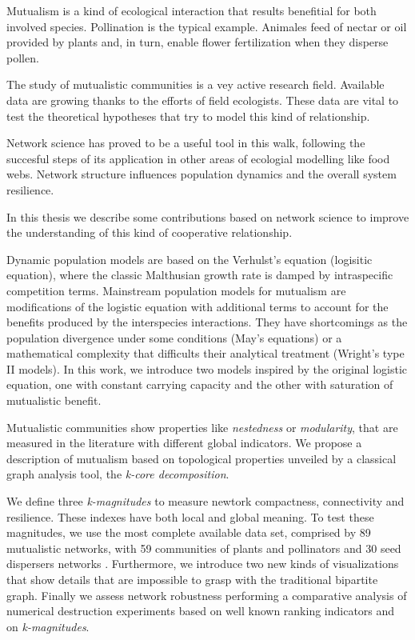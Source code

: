 \documentclass[
11pt, %
spanish, %
onehalfspacing, %
]{MastersDoctoralThesis_custom} %
\newcounter{theo}%
\begin{document}
\renewcommand{\authorshipname}{Abstract}
\begin{declaration}
\addchaptertocentry{\authorshipname}

Mutualism is a kind of ecological interaction that results benefitial for both involved species. Pollination is the typical example. Animales feed of nectar or oil provided by plants and, in turn, enable flower fertilization when they disperse pollen.   

The study of mutualistic communities is a vey active research field. Available data are growing thanks to the efforts of field ecologists. These data are vital to test the theoretical hypotheses that try to model this kind of relationship.

Network science has proved to be a useful tool in this walk, following the succesful steps of its application in other areas of ecologial modelling like food webs. Network structure influences population dynamics and the overall system resilience. 

In this thesis we describe some contributions based on network science to improve the understanding of this kind of cooperative relationship. 

Dynamic population models are based on the Verhulst’s equation (logisitic equation), where the classic Malthusian growth rate is damped by intraspecific competition terms. Mainstream population models for mutualism are modifications of the logistic equation with additional terms to account for the benefits produced by the interspecies interactions. They have shortcomings as the population divergence under some conditions (May’s equations) or a mathematical complexity that difficults their analytical treatment
(Wright’s type II models). In this work, we introduce two models inspired by the original logistic equation, one with constant carrying capacity and the other with saturation of mutualistic benefit.

Mutualistic communities show properties like \textit{nestedness} or \textit{modularity}, that are measured in the literature with different global indicators. We propose a description of mutualism based on topological properties unveiled by a classical graph analysis tool, the \textit{k-core decomposition}.

We define three \textit{k-magnitudes} to measure newtork compactness, connectivity and resilience. These indexes have both local and global meaning. To test these magnitudes, we use the most complete
available data set, comprised by 89 mutualistic networks, with 59 communities of plants
and pollinators and 30 seed dispersers networks . Furthermore, we introduce two
new kinds of visualizations that show details that are impossible to grasp with
the traditional bipartite graph. Finally we assess network robustness performing a comparative analysis of numerical destruction experiments based on well known ranking indicators and on \textit{k-magnitudes}.

\end{declaration}
\end{document}
